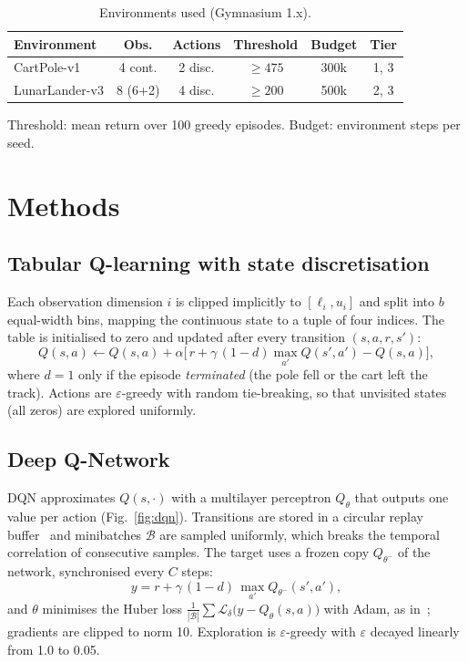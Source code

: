 \documentclass[10pt,twocolumn,letterpaper]{article}
\newcommand{\eps}{\varepsilon}
\begin{document}
\begin{table}[t]
\centering
\caption{Environments used (Gymnasium 1.x).}
\label{tab:envs}
\small
\setlength{\tabcolsep}{4pt}
\begin{tabular}{@{}lccccc@{}}
\toprule
Environment & Obs. & Actions & Threshold & Budget & Tier \\
\midrule
CartPole-v1    & 4 cont.  & 2 disc. & $\ge 475$ & 300k & 1, 3 \\
LunarLander-v3 & 8 (6+2)  & 4 disc. & $\ge 200$ & 500k & 2, 3 \\
\bottomrule
\end{tabular}
\vspace{2pt}

\footnotesize Threshold: mean return over 100 greedy episodes. Budget: environment steps per seed.
\end{table}

\section{Methods}

\subsection{Tabular Q-learning with state discretisation}
Each observation dimension $i$ is clipped implicitly to $[\ell_i,u_i]$ and split into $b$ equal-width bins, mapping the continuous state to a tuple of four indices. The table is initialised to zero and updated after every transition $(s,a,r,s')$:
\begin{equation}
Q(s,a) \leftarrow Q(s,a) + \alpha\big[\,r + \gamma\,(1-d)\max_{a'} Q(s',a') - Q(s,a)\big],
\label{eq:qlearning}
\end{equation}
where $d=1$ only if the episode \emph{terminated} (the pole fell or the cart left the track). Actions are $\eps$-greedy with random tie-breaking, so that unvisited states (all zeros) are explored uniformly.

\subsection{Deep Q-Network}
DQN approximates $Q(s,\cdot)$ with a multilayer perceptron $Q_\theta$ that outputs one value per action (Fig.~\ref{fig:dqn}). Transitions are stored in a circular replay buffer~\cite{lin1992} and minibatches $\mathcal{B}$ are sampled uniformly, which breaks the temporal correlation of consecutive samples. The target uses a frozen copy $Q_{\theta^-}$ of the network, synchronised every $C$ steps:
\begin{equation}
y = r + \gamma\,(1-d)\,\max_{a'} Q_{\theta^-}(s',a'),
\label{eq:dqn}
\end{equation}
and $\theta$ minimises the Huber loss $\frac{1}{|\mathcal{B}|}\sum \mathcal{L}_\delta\big(y - Q_\theta(s,a)\big)$ with Adam, as in~\cite{mnih2015}; gradients are clipped to norm 10. Exploration is $\eps$-greedy with $\eps$ decayed linearly from 1.0 to 0.05.
\end{document}
